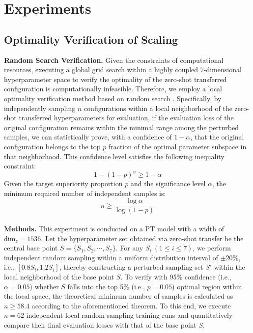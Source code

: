 \documentclass[11pt]{article}
\begin{document}
\section{Experiments}

\subsection{Optimality Verification of Scaling}

\textbf{Random Search Verification.} Given the constraints of computational resources, executing a global grid search within a highly coupled 7-dimensional hyperparameter space to verify the optimality of the zero-shot transferred configuration is computationally infeasible. Therefore, we employ a local optimality verification method based on random search \cite{bergstra2012random}. Specifically, by independently sampling $n$ configurations within a local neighborhood of the zero-shot transferred hyperparameters for evaluation, if the evaluation loss of the original configuration remains within the minimal range among the perturbed samples, we can statistically prove, with a confidence of $1-\alpha$, that the original configuration belongs to the top $p$ fraction of the optimal parameter subspace in that neighborhood. This confidence level satisfies the following inequality constraint:
\begin{equation}
1-(1-p)^n \geq 1-\alpha
\end{equation}
Given the target superiority proportion $p$ and the significance level $\alpha$, the minimum required number of independent samples is:
\begin{equation}
n \geq \frac{\log \alpha}{\log (1-p)}
\end{equation}
\\

\noindent
\textbf{Methods.} This experiment is conducted on a PT model with a width of $\text{dim}_z=1536$. Let the hyperparameter set obtained via zero-shot transfer be the central base point $S=\{S_1, S_2, \cdots, S_7\}$. For any $S_i\ (1 \leq i \leq 7)$, we perform independent random sampling within a uniform distribution interval of $\pm 20\%$, i.e., $[0.8S_i, 1.2S_i]$, thereby constructing a perturbed sampling set $S'$ within the local neighborhood of the base point $S$. To verify with 95\% confidence (i.e., $\alpha=0.05$) whether $S$ falls into the top 5\% (i.e., $p=0.05$) optimal region within the local space, the theoretical minimum number of samples is calculated as $n \geq 58.4$ according to the aforementioned theorem. To this end, we execute $n=62$ independent local random sampling training runs and quantitatively compare their final evaluation losses with that of the base point $S$.\\
\end{document}
